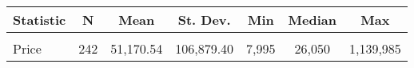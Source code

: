 
\begin{tabular}{@{\hspace{5pt}}lcccccc} 
\toprule 
 
Statistic & \multicolumn{1}{c}{N} & \multicolumn{1}{c}{Mean} & \multicolumn{1}{c}{St. Dev.} & \multicolumn{1}{c}{Min} & \multicolumn{1}{c}{Median} & \multicolumn{1}{c}{Max} \\ 
\midrule \\[-2.1ex] 
Price & 242 & 51,170.54 & 106,879.40 & 7,995 & 26,050 & 1,139,985 \\ 
\bottomrule 
\end{tabular} 
